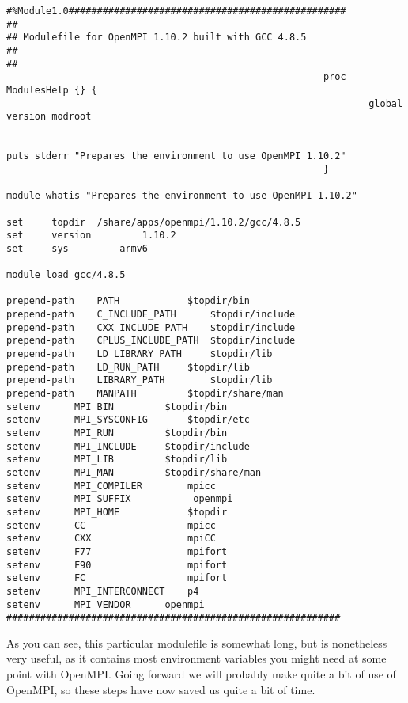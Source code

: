 \documentclass[]{article}
\begin{document}
                                                        \begin{lstlisting}
#%Module1.0#################################################
##
## Modulefile for OpenMPI 1.10.2 built with GCC 4.8.5
##
##
                                                        proc ModulesHelp {} {
                                                                global version modroot
                                                                        
                                                                        puts stderr "Prepares the environment to use OpenMPI 1.10.2"
                                                        }

module-whatis "Prepares the environment to use OpenMPI 1.10.2"

set     topdir  /share/apps/openmpi/1.10.2/gcc/4.8.5
set     version         1.10.2
set     sys         armv6

module load gcc/4.8.5

prepend-path    PATH            $topdir/bin
prepend-path    C_INCLUDE_PATH      $topdir/include
prepend-path    CXX_INCLUDE_PATH    $topdir/include
prepend-path    CPLUS_INCLUDE_PATH  $topdir/include
prepend-path    LD_LIBRARY_PATH     $topdir/lib
prepend-path    LD_RUN_PATH     $topdir/lib
prepend-path    LIBRARY_PATH        $topdir/lib
prepend-path    MANPATH         $topdir/share/man
setenv      MPI_BIN         $topdir/bin
setenv      MPI_SYSCONFIG       $topdir/etc
setenv      MPI_RUN         $topdir/bin
setenv      MPI_INCLUDE     $topdir/include
setenv      MPI_LIB         $topdir/lib
setenv      MPI_MAN         $topdir/share/man
setenv      MPI_COMPILER        mpicc
setenv      MPI_SUFFIX          _openmpi
setenv      MPI_HOME            $topdir
setenv      CC                  mpicc
setenv      CXX                 mpiCC
setenv      F77                 mpifort
setenv      F90                 mpifort
setenv      FC                  mpifort
setenv      MPI_INTERCONNECT    p4
setenv      MPI_VENDOR      openmpi
###########################################################
\end{lstlisting}
As you can see, this particular modulefile is somewhat long, but is nonetheless very useful, as it contains most environment variables
you might need at some point with OpenMPI. Going forward we will probably make quite a bit of use of OpenMPI, so these steps have now
saved us quite a bit of time.
\end{document}
